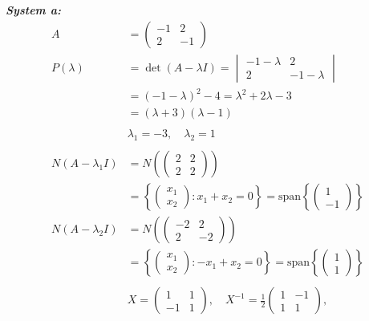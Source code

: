\documentclass{article}
\begin{document}
\newpage
\noindent\textbf{\textit{System a:}}
\begin{align*}
    A &= \begin{pmatrix} -1 & 2 \\ 2 & -1 \end{pmatrix} \\
    P(\lambda) &= \det(A - \lambda I) = \begin{vmatrix} -1 - \lambda & 2 \\ 2 & -1 - \lambda \end{vmatrix} \\
    &= (-1 - \lambda)^2 - 4 = \lambda^2 + 2\lambda - 3 \\
    &= (\lambda + 3)(\lambda - 1) \\
    \\
    &\lambda_1 = -3, \quad \lambda_2 = 1 \\
    \\
    N(A - \lambda_1 I) &= N\left(\begin{pmatrix} 2 & 2 \\ 2 & 2 \end{pmatrix}\right) \\
    &= \left\{ \begin{pmatrix} x_1 \\ x_2 \end{pmatrix} : x_1 + x_2 = 0 \right\}
    = \text{span}\left\{ \begin{pmatrix} 1 \\ -1 \end{pmatrix} \right\} \\
    N(A - \lambda_2 I) &= N\left(\begin{pmatrix} -2 & 2 \\ 2 & -2 \end{pmatrix}\right) \\
    &= \left\{ \begin{pmatrix} x_1 \\ x_2 \end{pmatrix} : -x_1 + x_2 = 0 \right\}
    = \text{span}\left\{ \begin{pmatrix} 1 \\ 1 \end{pmatrix} \right\} \\
    \\
    &X = \begin{pmatrix} 1 & 1 \\ -1 & 1 \end{pmatrix} , \quad
    X^{-1} = \frac{1}{2} \begin{pmatrix} 1 & -1 \\ 1 & 1 \end{pmatrix} , \quad

\end{align*}
\end{document}
